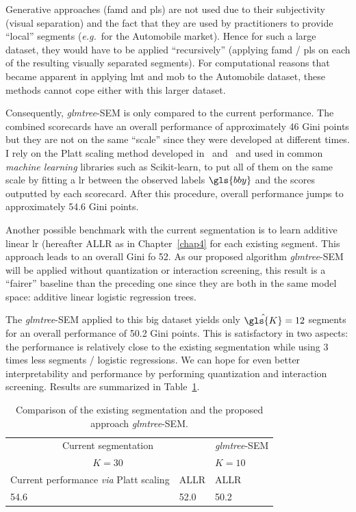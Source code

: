 Generative approaches (\gls{famd} and \gls{pls}) are not used due to their subjectivity (visual separation) and the fact that they are used by practitioners to provide ``local'' segments (\textit{e.g.}\ for the Automobile market). Hence for such a large dataset, they would have to be applied ``recursively'' (applying \gls{famd} / \gls{pls} on each of the resulting visually separated segments). For computational reasons that became apparent in applying \gls{lmt} and \gls{mob} to the Automobile dataset, these methods cannot cope either with this larger dataset.

Consequently, \textit{glmtree}-SEM is only compared to the current performance. The combined scorecards have an overall performance of approximately 46 Gini points but they are not on the same ``scale'' since they were developed at different times. I rely on the Platt scaling method developed in~\cite{platt1999probabilistic} and~\cite{zadrozny2002transforming} and used in common \textit{machine learning} libraries such as Scikit-learn, to put all of them on the same scale by fitting a \gls{lr} between the observed labels $\gls{bby}$ and the scores outputted by each scorecard. After this procedure, overall performance jumps to approximately 54.6 Gini points.

Another possible benchmark with the current segmentation is to learn additive linear \gls{lr} (hereafter ALLR as in Chapter~\ref{chap4} for each existing segment. This approach leads to an overall Gini fo 52. As our proposed algorithm \textit{glmtree}-SEM will be applied without quantization or interaction screening, this result is a ``fairer'' baseline than the preceding one since they are both in the same model space: additive linear logistic regression trees.

The \textit{glmtree}-SEM applied to this big dataset yields only $\hat{\gls{K}} = 12$ segments for an overall performance of 50.2 Gini points. This is satisfactory in two aspects: the performance is relatively close to the existing segmentation while using 3 times less segments / logistic regressions. We can hope for even better interpretability and performance by performing quantization and interaction screening. Results are summarized in Table~\ref{tab:res_tot_trees}.

\begin{table}[t]
\caption{\label{tab:res_tot_trees} Comparison of the existing segmentation and the proposed approach \textit{glmtree}-SEM.}
\centering
\begin{tabular}{l|l|l}
\multicolumn{2}{c|}{Current segmentation} & \textit{glmtree}-SEM \\
\multicolumn{2}{c|}{$K = 30$} & $K = 10$ \\
\hline
Current performance \textit{via} Platt scaling & ALLR & ALLR \\
\hline
54.6 & 52.0 & 50.2 \\
\end{tabular}
\end{table}


